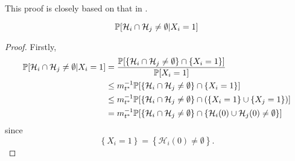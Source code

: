 This proof is closely based on that in \cite{Lubetzky2014-po}.
\begin{lemma}
	\begin{equation}
		\mathbb{P}[\mathcal{H}_i \cap \mathcal{H}_j \neq \emptyset | X_i = 1]
	\end{equation}
\end{lemma}
\begin{proof}
	Firstly,
	\begin{align}
		\mathbb{P}[\mathcal{H}_i \cap \mathcal{H}_j \neq \emptyset | X_i = 1] &= \frac{\mathbb{P}[\left\{\mathcal{H}_i \cap \mathcal{H}_j \neq \emptyset\right\} \cap \{X_i = 1\}]}{\mathbb{P}[X_i = 1]}\\
		&\leq m_{t^*}^{-1} \mathbb{P}[\left\{\mathcal{H}_i \cap \mathcal{H}_j \neq \emptyset\right\} \cap \{X_i = 1\}]\\
		&\leq  m_{t^*}^{-1} \mathbb{P}[\left\{\mathcal{H}_i \cap \mathcal{H}_j \neq \emptyset\right\} \cap \left(\{X_i = 1\} \cup \{X_j = 1\}\right)]\\
		&= m_{t^*}^{-1} \mathbb{P}[\left\{\mathcal{H}_i \cap \mathcal{H}_j \neq \emptyset\right\} \cap \left\{\mathcal{H}_i(0) \cup \mathcal{H}_j(0) \neq \emptyset\right\}]
	\end{align}
	since
	\begin{equation}
		\left\{X_i = 1\right\} = \left\{\mathcal{H}_i(0) \neq \emptyset\right\}.
	\end{equation}

\end{proof}
